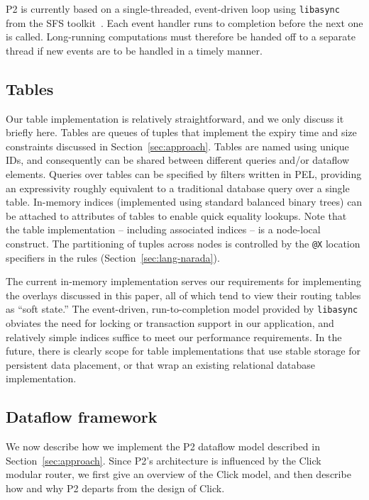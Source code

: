 \documentclass{sig-alt-full}
\def\Sys{P2\xspace}
\def\ELang{PEL\xspace}
\newcommand{\ol}[1]{{\tt\footnotesize#1}}
\begin{document}
\Sys is currently based on a single-threaded, event-driven loop using
\texttt{libasync} from the SFS toolkit~\cite{mazieres-usenix-2001}.
Each event handler runs to completion before the next one is called.
Long-running computations must therefore be handed off to a separate
thread if new events are to be handled in a timely manner.

\subsection{Tables}

Our table implementation is relatively straightforward, and we only
discuss it briefly here.  Tables are queues of tuples that implement
the expiry time and size constraints discussed in
Section~\ref{sec:approach}.  Tables are named using unique IDs, and
consequently can be shared between 
different queries and/or dataflow elements.   
Queries over tables can be specified by
filters written in \ELang, providing an expressivity roughly
equivalent to a traditional database query over a single table.
In-memory indices (implemented using standard balanced binary trees)
can be attached to attributes of tables to enable 
quick equality lookups.  Note that the table implementation --
including associated indices -- is a node-local construct.  The
partitioning of tuples across nodes is controlled by the \ol{@X}
location specifiers in the rules (Section~\ref{sec:lang-narada}).

The current in-memory implementation serves our requirements for
implementing the overlays discussed in this paper, all of which tend
to view their routing tables as ``soft state.'' The event-driven,
run-to-completion model provided by \texttt{libasync} obviates the
need for locking or transaction support in our application, and
relatively simple indices suffice to meet our performance
requirements. 
In the future, there is clearly scope for
table implementations that use stable storage for persistent
data placement, or that wrap an existing relational database implementation. 

\subsection{Dataflow framework}
 
We now describe how we implement the \Sys dataflow model described in
Section~\ref{sec:approach}.  Since \Sys's architecture 
is influenced by the Click~\cite{click-tocs} modular router, we first
give an overview of the Click model, and then describe how and why
\Sys departs from the design of Click. 
\end{document}
